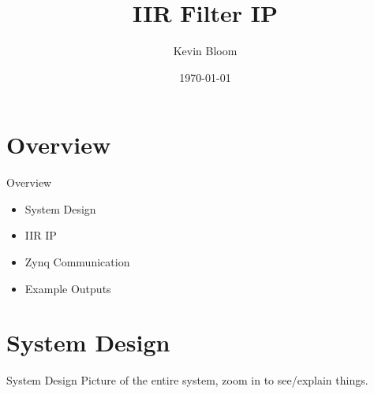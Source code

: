 \documentclass{beamer}
\title{IIR Filter IP}
\date{\today}
\author{Kevin Bloom}
\institute{Pennsylvania College of Technology}
\begin{document}
\maketitle

\section{Overview}
\begin{frame}{Overview}
  \begin{itemize}[<+>]
  \item System Design
  \item IIR IP
  \item Zynq Communication
  \item Example Outputs
  \end{itemize}
\end{frame}

\section{System Design}
\begin{frame}{System Design}
  Picture of the entire system, zoom in to see/explain things.
\end{frame}
\end{document}
